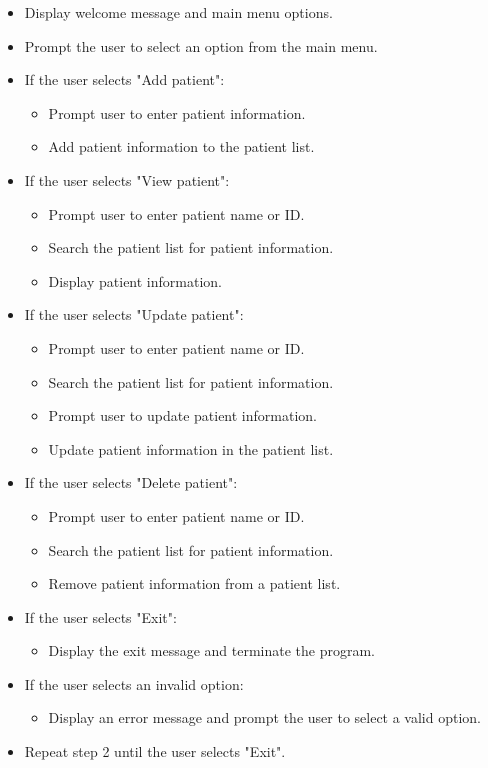\documentclass[12pt]{article}
\begin{document}
			\begin{itemize}
				\item Display welcome message and main menu options.
				\item Prompt the user to select an option from the main menu.
				\item If the user selects "Add patient":
				\begin{itemize}
					\item Prompt user to enter patient information.
					\item Add patient information to the patient list.
				\end{itemize}
				\item If the user selects "View patient":
				\begin{itemize}
					\item Prompt user to enter patient name or ID.
					\item Search the patient list for patient information.
					\item Display patient information.
				\end{itemize}
				\item If the user selects "Update patient":
				\begin{itemize}
					\item Prompt user to enter patient name or ID.
					\item Search the patient list for patient information.
					\item Prompt user to update patient information.
					\item Update patient information in the patient list.
				\end{itemize}
				\item If the user selects "Delete patient":
				\begin{itemize}
					\item Prompt user to enter patient name or ID.
					\item Search the patient list for patient information.
					\item Remove patient information from a patient list.
				\end{itemize}
				\item If the user selects "Exit":
				\begin{itemize}
					\item Display the exit message and terminate the program.
				\end{itemize}
				\item If the user selects an invalid option:
				\begin{itemize}
					\item Display an error message and prompt the user to select a valid option.
				\end{itemize}
				\item Repeat step 2 until the user selects "Exit".
			\end{itemize}
			
\end{document}
